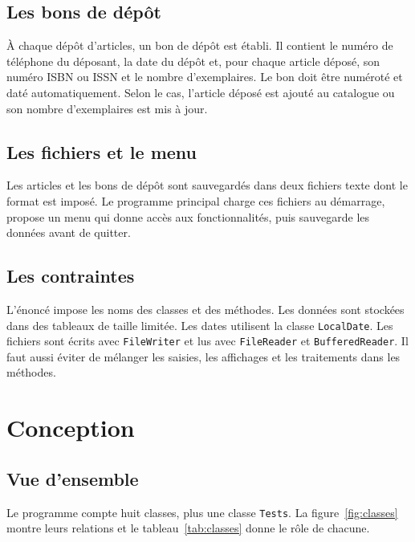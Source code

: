 \documentclass[11pt,a4paper]{article}
\newcommand{\code}[1]{\texttt{#1}}
\begin{document}
\subsection{Les bons de dépôt}

À chaque dépôt d'articles, un bon de dépôt est établi. Il contient le numéro de téléphone du
déposant, la date du dépôt et, pour chaque article déposé, son numéro ISBN ou ISSN et le nombre
d'exemplaires. Le bon doit être numéroté et daté automatiquement. Selon le cas, l'article déposé
est ajouté au catalogue ou son nombre d'exemplaires est mis à jour.

\subsection{Les fichiers et le menu}

Les articles et les bons de dépôt sont sauvegardés dans deux fichiers texte dont le format est
imposé. Le programme principal charge ces fichiers au démarrage, propose un menu qui donne accès
aux fonctionnalités, puis sauvegarde les données avant de quitter.

\subsection{Les contraintes}

L'énoncé impose les noms des classes et des méthodes. Les données sont stockées dans des tableaux
de taille limitée. Les dates utilisent la classe \code{LocalDate}. Les fichiers sont écrits avec
\code{FileWriter} et lus avec \code{FileReader} et \code{BufferedReader}. Il faut aussi éviter de
mélanger les saisies, les affichages et les traitements dans les méthodes.

\section{Conception}
\label{sec:conception}

\subsection{Vue d'ensemble}

Le programme compte huit classes, plus une classe \code{Tests}. La figure~\ref{fig:classes} montre
leurs relations et le tableau~\ref{tab:classes} donne le rôle de chacune.
\end{document}
